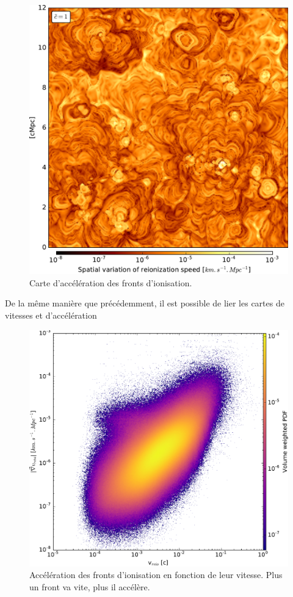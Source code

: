 \begin{figure}[htpb]
        \includegraphics[width=.95\linewidth]{img/04_mapreio/map_acc_c1.pdf} 
        \caption{Carte d'accélération des fronts d'ionisation.
        }
 		\label{fig:acc}
\end{figure}





De la même manière que précédemment, il est possible de lier les cartes de vitesses et d'accélération
\begin{figure}[htpb]
        \includegraphics[width=.95\linewidth]{img/04_mapreio/v_gradv_c1.pdf} 
        \caption{Accélération des fronts d'ionisation en fonction de leur vitesse.
        Plus un front va vite, plus il accélère.
        }
 		\label{fig:accspeed}
\end{figure}


